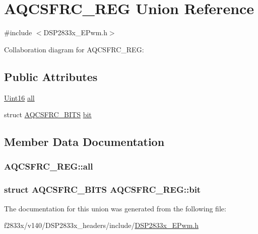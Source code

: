 \hypertarget{union_a_q_c_s_f_r_c___r_e_g}{}\section{A\+Q\+C\+S\+F\+R\+C\+\_\+\+R\+E\+G Union Reference}
\label{union_a_q_c_s_f_r_c___r_e_g}


{\ttfamily \#include $<$D\+S\+P2833x\+\_\+\+E\+Pwm.\+h$>$}



Collaboration diagram for A\+Q\+C\+S\+F\+R\+C\+\_\+\+R\+E\+G\+:
\subsection*{Public Attributes}
\begin{DoxyCompactItemize}
\item 
\hyperlink{_d_s_p2833x___device_8h_a59a9f6be4562c327cbfb4f7e8e18f08b}{Uint16} \hyperlink{union_a_q_c_s_f_r_c___r_e_g_a67723d7469342c87613d15fa81f06249}{all}
\item 
struct \hyperlink{struct_a_q_c_s_f_r_c___b_i_t_s}{A\+Q\+C\+S\+F\+R\+C\+\_\+\+B\+I\+T\+S} \hyperlink{union_a_q_c_s_f_r_c___r_e_g_a6dbdc1ad495403284ffd3bf01fc0f270}{bit}
\end{DoxyCompactItemize}


\subsection{Member Data Documentation}
\hypertarget{union_a_q_c_s_f_r_c___r_e_g_a67723d7469342c87613d15fa81f06249}{}
\subsubsection[{all}]{ A\+Q\+C\+S\+F\+R\+C\+\_\+\+R\+E\+G\+::all}\label{union_a_q_c_s_f_r_c___r_e_g_a67723d7469342c87613d15fa81f06249}
\hypertarget{union_a_q_c_s_f_r_c___r_e_g_a6dbdc1ad495403284ffd3bf01fc0f270}{}
\subsubsection[{bit}]{\setlength{\rightskip}{0pt plus 5cm}struct {\bf A\+Q\+C\+S\+F\+R\+C\+\_\+\+B\+I\+T\+S} A\+Q\+C\+S\+F\+R\+C\+\_\+\+R\+E\+G\+::bit}\label{union_a_q_c_s_f_r_c___r_e_g_a6dbdc1ad495403284ffd3bf01fc0f270}


The documentation for this union was generated from the following file\+:\begin{DoxyCompactItemize}
\item 
f2833x/v140/\+D\+S\+P2833x\+\_\+headers/include/\hyperlink{_d_s_p2833x___e_pwm_8h}{D\+S\+P2833x\+\_\+\+E\+Pwm.\+h}\end{DoxyCompactItemize}
